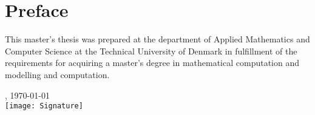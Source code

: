 \chapter{Preface}
This master's thesis was prepared at the department of Applied Mathematics and Computer Science at the Technical University of Denmark in fulfillment of the requirements for acquiring a master's degree in mathematical computation and modelling and computation.

\vfill
{}
{
\centering
    \thesislocation{}, \today\\[1cm]
    \hspace{3cm}\texttt{[image: Signature]}\\[1cm]
\begin{flushright}
    \thesisauthor{}
\end{flushright}
}